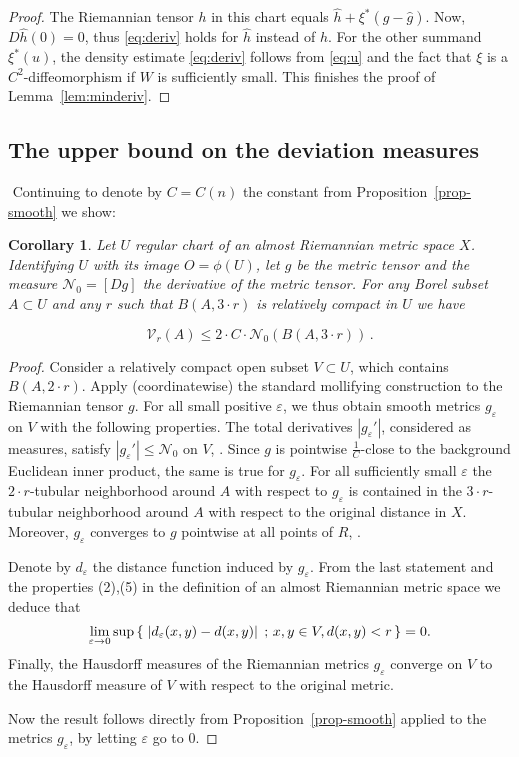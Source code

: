 \documentclass[12pt,leqno,intlimits]{amsart}
\numberwithin{equation}{section}
\newtheorem{cor}[thm]{Corollary}
\theoremstyle{definition}
\theoremstyle{remark}
\newcommand{\pref}[1]{Proposition~\ref{#1}}
\newcommand{\lref}[1]{Lemma~\ref{#1}}
\newcommand*{\set}[2]{\left\{\,\left.{#1}\vphantom{#2}\,\right.;\,{#2}\,\right\}}
\begin{document}
\begin{proof}
The Riemannian tensor $h$ in this chart equals $\hat h +\xi^{\ast } (g-\hat g)$.
Now, $D\hat h (0) =0$, thus
\eqref{eq:deriv} holds for $\hat h$ instead of $h$. For the other summand $\xi ^{\ast} (u)$, the density estimate
\eqref{eq:deriv} follows from \eqref{eq:u} and the fact that $\xi$ is a $C^2$-diffeomorphism
if $W$ is sufficiently small. This finishes the proof of \lref{lem:minderiv}.
\end{proof}


\subsection{The upper bound on the deviation measures}
$ $
%
Continuing to denote by $C=C(n)$ the constant from Proposition~\ref{prop-smooth} we show:

\begin{cor} \label{cor-dc-vr}
Let $U$ regular chart of an almost Riemannian metric space $X$. Identifying $U$ with its image $O=\phi (U)$, let
$g$ be the metric tensor and the measure $\mathcal N_0 =[Dg]$ the derivative of the metric tensor. For any Borel subset $A\subset U$ and any $r$
such that $B (A,{3{\cdot}r})$ is relatively compact in $U$ we have

\[
\mathcal{V}_r (A) \leq 2 \cdot C \cdot \mathcal N_0 (B (A,{3{\cdot}r}))\, .
\]
\end{cor}

\begin{proof}
Consider a relatively compact open subset $ V \subset U$, which contains $B (A,{2{\cdot}r})$. Apply (coordinatewise) the standard mollifying construction
to the Riemannian tensor $g$. For all small positive $\varepsilon$, we thus obtain smooth metrics $g_{\varepsilon}$ on $V$ with the following properties.
The total derivatives $|g_{\varepsilon} '|$, considered as measures, satisfy $|g_{\varepsilon} '|\leq \mathcal N_0$ on $V$, \cite[Theorem 5.3.1]{Ziemer}. Since $g$ is pointwise $\frac 1 C$-close to the background Euclidean inner product, the same is true for $g_{\varepsilon}$. For all sufficiently small $\varepsilon$ the $2{\cdot}r$-tubular neighborhood around $A$ with respect to $g_{\varepsilon}$ is contained in the $3{\cdot}r$-tubular neighborhood around $A$ with respect to the original distance in $X$. Moreover, $g_{\varepsilon}$ converges to $g$ pointwise at all points of $R$, \cite[Theorem 1.6.1]{Ziemer}.

Denote by $d_{\varepsilon}$ the distance function induced by $g_{\varepsilon}$. From the last statement and the properties (2),(5) in the definition of an almost Riemannian metric space we deduce that
\[
\lim _{\varepsilon \to 0} \sup \set{|d_{\varepsilon} (x,y) -d(x,y)|}{x,y \in V, d(x,y) <r}=0  .
\]
Finally, the Hausdorff measures of the Riemannian metrics $g_{\varepsilon}$ converge on $V$ to the Hausdorff measure of $V$ with respect to the original metric.

Now the result follows directly from \pref{prop-smooth} applied to the metrics $g_{\varepsilon}$, by letting $\varepsilon$ go to $0$.
\end{proof}
\end{document}
